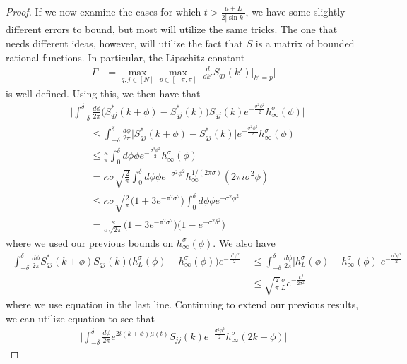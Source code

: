 \documentclass[../thesis-main/thesis-main]{subfiles}
\begin{document}
\begin{proof}
If we now examine the cases for which $t > \frac{\mu + L}{2|\sin k|}$, we have some slightly different errors to bound, but most will utilize the same tricks.  The one that needs different ideas, however, will utilize the fact that $S$ is a matrix of bounded rational functions.  In particular, the Lipschitz constant
\begin{align}
  \Gamma &= \max_{q,j\in [N]} \max_{p\in [-\pi,\pi]} \Bigg| \frac{d}{dk'} S_{qj}(k') \Big|_{k' = p} \Bigg|
\end{align}
is well defined.  Using this, we then have that
\begin{align}
  &\Big|\int_{-\delta}^\delta \frac{d\phi}{2\pi} \big(S_{qj}^*(k+\phi )- S_{qj}^*(k)\big) S_{qj}(k) e^{-\frac{\sigma^2\phi^2}{2}}h_{\infty}^\sigma(\phi)\Big| \nonumber\\
   & \qquad \leq \int_{-\delta}^\delta \frac{d\phi}{2\pi} \big|S_{qj}^*(k+\phi )- S_{qj}^*(k)\big|e^{-\frac{\sigma^2\phi^2}{2}}h_{\infty}^\sigma(\phi)\\
   & \qquad\leq \frac{\kappa}{\pi} \int_{0}^\delta d\phi \phi e^{-\frac{\sigma^2\phi^2}{2}}h_\infty^\sigma(\phi)\\
   & \qquad = \kappa\sigma \sqrt{\frac{2}{\pi}}\int_0^\delta d\phi \phi e^{-\sigma^2 \phi^2} h_{\infty}^{1/(2\pi\sigma)} (2\pi i \sigma^2 \phi)\\
   & \qquad \leq \kappa\sigma \sqrt{\frac{2}{\pi}} \big( 1 + 3 e^{-\pi^2\sigma^2}\big) \int_{0}^\delta d\phi \phi e^{ -\sigma^2\phi^2}\\
   & \qquad = \frac{\kappa}{\sigma \sqrt{2\pi}} \big(1 + 3 e^{-\pi^2 \sigma^2}\big) \big( 1 - e^{-\sigma^2\delta^2}\big)
\end{align}
where we used our previous bounds on $h_\infty^\sigma(\phi)$.  We also have
\begin{align}
  \Big|\int_{-\delta}^\delta \frac{d\phi}{2\pi} S_{qj}^*(k+\phi) S_{qj}(k) \big(h_{L}^\sigma (\phi) - h_\infty^\sigma(\phi)\big) e^{-\frac{\sigma^2\phi^2}{2}}\Big|
    & \leq \int_{-\delta}^\delta \frac{d\phi}{2\pi}  \big|h_{L}^\sigma (\phi) - h_\infty^\sigma(\phi)\big| e^{-\frac{\sigma^2\phi^2}{2}}\\
    & \leq \sqrt{\frac{2}{\pi}} \frac{\sigma}{L} e^{-\frac{L^2}{2\sigma^2}}
\end{align}
where we use equation  in the last line.  Continuing to extend our previous results, we can utilize equation  to see that
\begin{align}
  \Bigg| \int_{-\delta}^\delta \frac{d\phi}{2\pi} e^{2 i (k+\phi) \mu(t)} S_{jj}(k) e^{-\frac{\sigma^2\phi^2}{2}} h_{\infty}^\sigma(2k+\phi)\Bigg| 

\end{align}
\end{proof}
\end{document}
